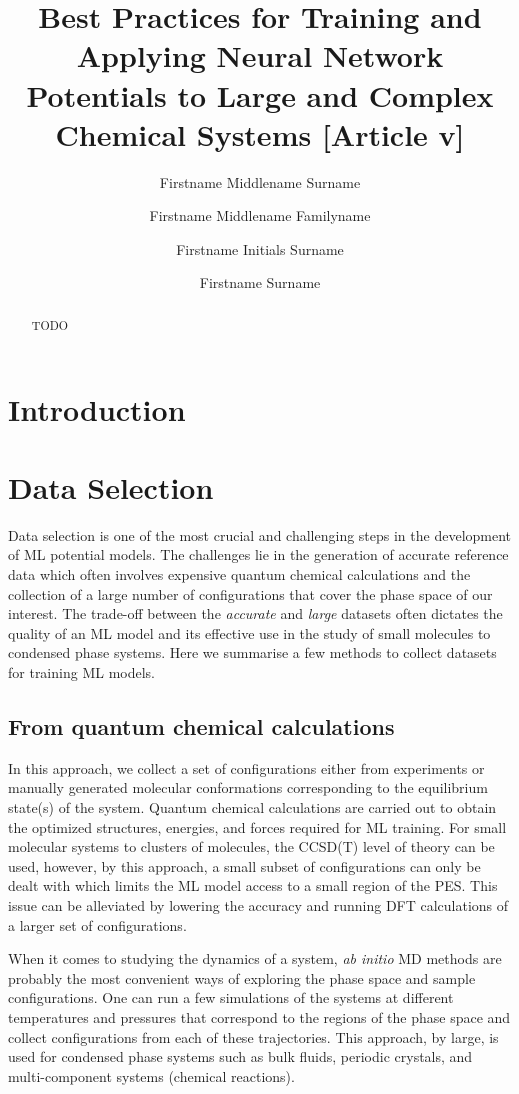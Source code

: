 \documentclass[9pt,bestpractices]{livecoms}
\title{Best Practices for Training and Applying Neural Network Potentials to Large and Complex Chemical Systems [Article v\versionnumber]}
\author[1*]{Firstname Middlename Surname}
\author[1,2\authfn{1}\authfn{3}]{Firstname Middlename Familyname}
\author[2\authfn{1}\authfn{4}]{Firstname Initials Surname}
\author[2*]{Firstname Surname}
\affil[1]{Institution 1}
\affil[2]{Institution 2}
\begin{document}
\begin{frontmatter}
\maketitle

\begin{abstract}
TODO
\end{abstract}

\end{frontmatter}


\section{Introduction}


\section{Data Selection}
Data selection is one of the most crucial and challenging steps in the development of ML potential models. The challenges lie in the generation of accurate reference data which often involves expensive quantum chemical calculations and the collection of a large number of configurations that cover the phase space of our interest. The trade-off between the {\em accurate} and {\em large} datasets often dictates the quality of an ML model and its effective use in the study of small molecules to condensed phase systems. Here we summarise a few methods to collect datasets for training ML models. 


\subsection{From quantum chemical calculations}
In this approach, we collect a set of configurations either from experiments or manually generated molecular conformations corresponding to the equilibrium state(s) of the system. Quantum chemical calculations are carried out to obtain the optimized structures, energies, and forces required for ML training. For small molecular systems to clusters of molecules, the CCSD(T) level of theory can be used, however, by this approach, a small subset of configurations can only be dealt with which limits the ML model access to a small region of the PES. This issue can be alleviated by lowering the accuracy and running DFT calculations of a larger set of configurations. 

When it comes to studying the dynamics of a system, {\em ab initio} MD methods are probably the most convenient ways of exploring the phase space and sample configurations. One can run a few simulations of the systems at different temperatures and pressures that correspond to the regions of the phase space and collect configurations from each of these trajectories. This approach, by large, is used for condensed phase systems such as bulk fluids, periodic crystals, and multi-component systems (chemical reactions). 
\end{document}
